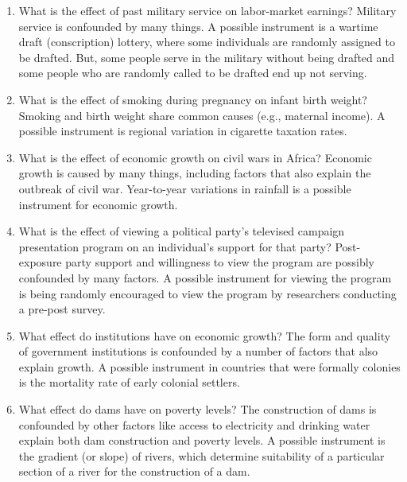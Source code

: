 \documentclass[a4paper,12pt]{article}
\begin{document}
\begin{enumerate}\itemsep0.5em

\item What is the effect of past military service on labor-market earnings? Military service is confounded by many things. A possible instrument is a wartime draft (conscription) lottery, where some individuals are randomly assigned to be drafted. But, some people serve in the military without being drafted and some people who are randomly called to be drafted end up not serving. %

\item What is the effect of smoking during pregnancy on infant birth weight? Smoking and birth weight share common causes (e.g., maternal income). A possible instrument is regional variation in cigarette taxation rates. %

\item What is the effect of economic growth on civil wars in Africa? Economic growth is caused by many things, including factors that also explain the outbreak of civil war. Year-to-year variations in rainfall is a possible instrument for economic growth. %

\item What is the effect of viewing a political party's televised campaign presentation program on an individual's support for that party? Post-exposure party support and willingness to view the program are possibly confounded by many factors. A possible instrument for viewing the program is being randomly encouraged to view the program by researchers conducting a pre-post survey. %

\item What effect do institutions have on economic growth? The form and quality of government institutions is confounded by a number of factors that also explain growth. A possible instrument in countries that were formally colonies is the mortality rate of early colonial settlers. %

\item What effect do dams have on poverty levels? The construction of dams is confounded by other factors like access to electricity and drinking water explain both dam construction and poverty levels. A possible instrument is the gradient (or slope) of rivers, which determine suitability of a particular section of a river for the construction of a dam. %


\end{enumerate}
\end{document}
